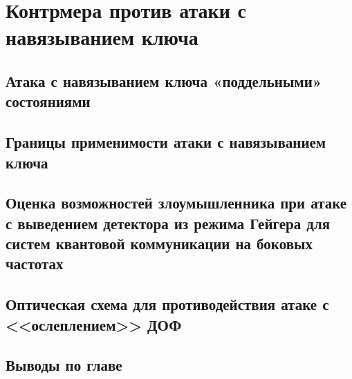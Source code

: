 \chapter{Контрмера против атаки с навязыванием ключа} \label{ch:ch3}
\section{Атака с навязыванием ключа «поддельными» состояниями} \label{sec:ch3/sec1}


\section{Границы применимости атаки с навязыванием ключа} \label{sec:ch3/sec2}




\section{Оценка возможностей злоумышленника при атаке с выведением детектора из режима Гейгера для систем квантовой коммуникации на боковых частотах} \label{sec:ch3/sec3}



\section{Оптическая схема для противодействия атаке с <<ослеплением>> ДОФ} \label{ch:ch3/sec4}

\section{} \label{ch:ch3/sec5}



\section{Выводы по главе} \label{ch:ch3/sect6}
